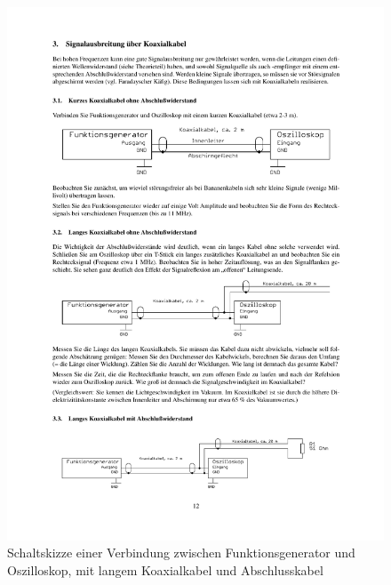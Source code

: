 \documentclass[12pt,a4paper]{article}
\begin{document}
\begin{figure}[H] 
  \centering
    \includegraphics[trim = 10mm 25mm 10mm 235mm, clip, scale = 1]{3-3_3.pdf}
  	\caption[Schaltskizze einer Verbindung zwischen Funktionsgenerator und Oszilloskop, mit langem Koaxialkabel und Abschlusskabel]{Schaltskizze einer Verbindung zwischen Funktionsgenerator und Oszilloskop, mit langem Koaxialkabel und Abschlusskabel\footnotemark}
  \label{fig:3.3}
\end{figure}
\end{document}
